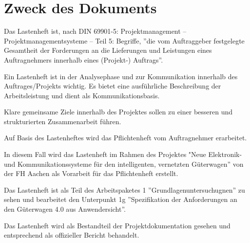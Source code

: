 \section*{Zweck des Dokuments}
Das Lastenheft ist, nach \acrshort{DIN} 69901-5: Projektmanagement – Projektmanagementsysteme – Teil 5: Begriffe, ''die vom Auftraggeber festgelegte Gesamtheit der Forderungen an die Lieferungen und Leistungen eines Auftragnehmers innerhalb eines (Projekt-) Auftrags''\cite{DIN69901-5}.\par
Ein Lastenheft ist in der Analysephase und zur Kommunikation innerhalb des Auftrages/Projekts wichtig. Es bietet eine ausführliche Beschreibung der Arbeitsleistung und dient als Kommunikationsbasis.\par
Klare gemeinsame Ziele innerhalb des Projektes sollen zu einer besseren und strukturierten Zusammenarbeit führen.\par
Auf Basis des Lastenheftes wird das Pflichtenheft vom Auftragnehmer erarbeitet.\par
In diesem Fall wird das Lastenheft im Rahmen des Projektes "Neue Elektronik- und Kommunikationssysteme für den intelligenten, vernetzten Güterwagen'' von der FH Aachen als Vorarbeit für das Pflichtenheft erstellt. \par
Das Lastenheft ist als Teil des Arbeitspaketes 1 ''Grundlagenuntersuchugnen'' zu sehen und bearbeitet den Unterpunkt 1g ''Spezifikation der Anforderungen an den Güterwagen 4.0 aus Anwendersicht''.\par
Das Lastenheft wird als Bestandteil der Projektdokumentation gesehen und entsprechend als offizieller Bericht behandelt.
